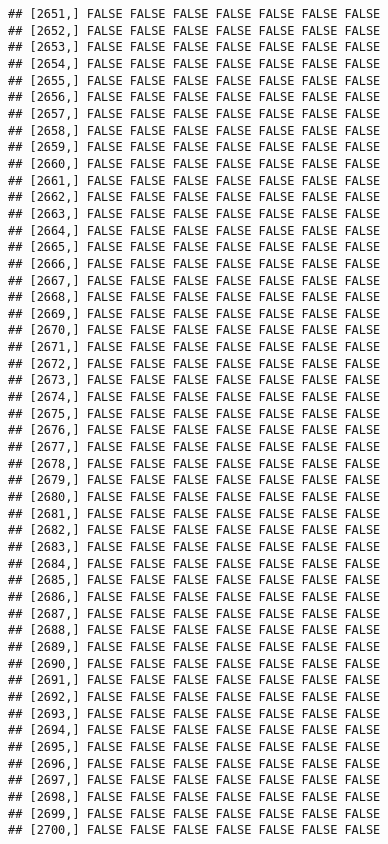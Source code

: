 \documentclass[
]{article}
\begin{document}
\begin{verbatim}
## [2651,] FALSE FALSE FALSE FALSE FALSE FALSE FALSE
## [2652,] FALSE FALSE FALSE FALSE FALSE FALSE FALSE
## [2653,] FALSE FALSE FALSE FALSE FALSE FALSE FALSE
## [2654,] FALSE FALSE FALSE FALSE FALSE FALSE FALSE
## [2655,] FALSE FALSE FALSE FALSE FALSE FALSE FALSE
## [2656,] FALSE FALSE FALSE FALSE FALSE FALSE FALSE
## [2657,] FALSE FALSE FALSE FALSE FALSE FALSE FALSE
## [2658,] FALSE FALSE FALSE FALSE FALSE FALSE FALSE
## [2659,] FALSE FALSE FALSE FALSE FALSE FALSE FALSE
## [2660,] FALSE FALSE FALSE FALSE FALSE FALSE FALSE
## [2661,] FALSE FALSE FALSE FALSE FALSE FALSE FALSE
## [2662,] FALSE FALSE FALSE FALSE FALSE FALSE FALSE
## [2663,] FALSE FALSE FALSE FALSE FALSE FALSE FALSE
## [2664,] FALSE FALSE FALSE FALSE FALSE FALSE FALSE
## [2665,] FALSE FALSE FALSE FALSE FALSE FALSE FALSE
## [2666,] FALSE FALSE FALSE FALSE FALSE FALSE FALSE
## [2667,] FALSE FALSE FALSE FALSE FALSE FALSE FALSE
## [2668,] FALSE FALSE FALSE FALSE FALSE FALSE FALSE
## [2669,] FALSE FALSE FALSE FALSE FALSE FALSE FALSE
## [2670,] FALSE FALSE FALSE FALSE FALSE FALSE FALSE
## [2671,] FALSE FALSE FALSE FALSE FALSE FALSE FALSE
## [2672,] FALSE FALSE FALSE FALSE FALSE FALSE FALSE
## [2673,] FALSE FALSE FALSE FALSE FALSE FALSE FALSE
## [2674,] FALSE FALSE FALSE FALSE FALSE FALSE FALSE
## [2675,] FALSE FALSE FALSE FALSE FALSE FALSE FALSE
## [2676,] FALSE FALSE FALSE FALSE FALSE FALSE FALSE
## [2677,] FALSE FALSE FALSE FALSE FALSE FALSE FALSE
## [2678,] FALSE FALSE FALSE FALSE FALSE FALSE FALSE
## [2679,] FALSE FALSE FALSE FALSE FALSE FALSE FALSE
## [2680,] FALSE FALSE FALSE FALSE FALSE FALSE FALSE
## [2681,] FALSE FALSE FALSE FALSE FALSE FALSE FALSE
## [2682,] FALSE FALSE FALSE FALSE FALSE FALSE FALSE
## [2683,] FALSE FALSE FALSE FALSE FALSE FALSE FALSE
## [2684,] FALSE FALSE FALSE FALSE FALSE FALSE FALSE
## [2685,] FALSE FALSE FALSE FALSE FALSE FALSE FALSE
## [2686,] FALSE FALSE FALSE FALSE FALSE FALSE FALSE
## [2687,] FALSE FALSE FALSE FALSE FALSE FALSE FALSE
## [2688,] FALSE FALSE FALSE FALSE FALSE FALSE FALSE
## [2689,] FALSE FALSE FALSE FALSE FALSE FALSE FALSE
## [2690,] FALSE FALSE FALSE FALSE FALSE FALSE FALSE
## [2691,] FALSE FALSE FALSE FALSE FALSE FALSE FALSE
## [2692,] FALSE FALSE FALSE FALSE FALSE FALSE FALSE
## [2693,] FALSE FALSE FALSE FALSE FALSE FALSE FALSE
## [2694,] FALSE FALSE FALSE FALSE FALSE FALSE FALSE
## [2695,] FALSE FALSE FALSE FALSE FALSE FALSE FALSE
## [2696,] FALSE FALSE FALSE FALSE FALSE FALSE FALSE
## [2697,] FALSE FALSE FALSE FALSE FALSE FALSE FALSE
## [2698,] FALSE FALSE FALSE FALSE FALSE FALSE FALSE
## [2699,] FALSE FALSE FALSE FALSE FALSE FALSE FALSE
## [2700,] FALSE FALSE FALSE FALSE FALSE FALSE FALSE

\end{verbatim}
\end{document}
